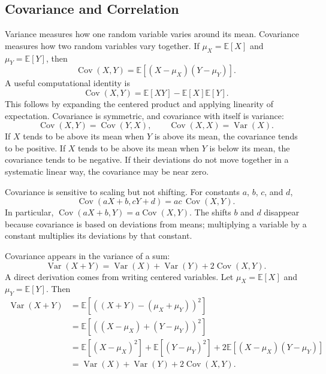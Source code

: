 {\subsection{Covariance and Correlation}

Variance measures how one random variable varies around its mean.  Covariance measures how two random variables vary together.  If $\mu_X=\mathbb{E}[X]$ and $\mu_Y=\mathbb{E}[Y]$, then
\begin{equation}
  \operatorname{Cov}(X,Y)
  = \mathbb{E}\left[(X-\mu_X)(Y-\mu_Y)\right].
  \label{eq:covariance-definition}
\end{equation}
A useful computational identity is
\begin{equation}
  \operatorname{Cov}(X,Y)
  =
  \mathbb{E}[XY]-\mathbb{E}[X]\mathbb{E}[Y].
  \label{eq:covariance-shortcut}
\end{equation}
This follows by expanding the centered product and applying linearity of expectation.  Covariance is symmetric, and covariance with itself is variance:
\begin{equation}
  \operatorname{Cov}(X,Y)=\operatorname{Cov}(Y,X),
  \qquad
  \operatorname{Cov}(X,X)=\operatorname{Var}(X).
  \label{eq:covariance-symmetry-self}
\end{equation}
If $X$ tends to be above its mean when $Y$ is above its mean, the covariance tends to be positive.  If $X$ tends to be above its mean when $Y$ is below its mean, the covariance tends to be negative.  If their deviations do not move together in a systematic linear way, the covariance may be near zero.

Covariance is sensitive to scaling but not shifting.  For constants $a$, $b$, $c$, and $d$,
\begin{equation}
  \operatorname{Cov}(aX+b,cY+d)=ac\,\operatorname{Cov}(X,Y).
  \label{eq:covariance-affine}
\end{equation}
In particular, \(\operatorname{Cov}(aX+b,Y)=a\operatorname{Cov}(X,Y)\).  The shifts \(b\) and \(d\) disappear because covariance is based on deviations from means; multiplying a variable by a constant multiplies its deviations by that constant.

Covariance appears in the variance of a sum:
\begin{equation}
  \operatorname{Var}(X+Y)
  = \operatorname{Var}(X)+\operatorname{Var}(Y)+2\operatorname{Cov}(X,Y).
  \label{eq:variance-sum}
\end{equation}
A direct derivation comes from writing centered variables.  Let $\mu_X=\mathbb{E}[X]$ and $\mu_Y=\mathbb{E}[Y]$.  Then
\begin{align*}
  \operatorname{Var}(X+Y)
  &= \mathbb{E}\left[\left((X+Y)-(\mu_X+\mu_Y)\right)^2\right] \\
  &= \mathbb{E}\left[\left((X-\mu_X)+(Y-\mu_Y)\right)^2\right] \\
  &= \mathbb{E}\left[(X-\mu_X)^2\right]
   + \mathbb{E}\left[(Y-\mu_Y)^2\right]
   + 2\mathbb{E}\left[(X-\mu_X)(Y-\mu_Y)\right] \\
  &= \operatorname{Var}(X)+\operatorname{Var}(Y)+2\operatorname{Cov}(X,Y).
\end{align*}

}
